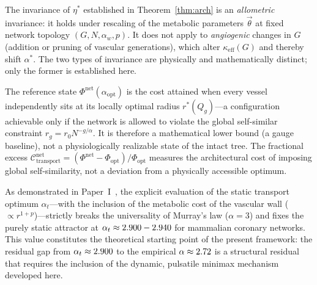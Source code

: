 \begin{remark}
The invariance of $\eta^*$ established in Theorem~\ref{thm:arch} is an
\emph{allometric} invariance: it holds under rescaling of the metabolic
parameters $\vec{\theta}$ at fixed network topology $(G, N, \alpha_w, p)$. It
does not apply to \emph{angiogenic} changes in $G$ (addition or pruning of
vascular generations), which alter $\kappa_{\mathrm{eff}}(G)$ and thereby shift
$\alpha^*$. The two types of invariance are physically and mathematically
distinct; only the former is established here.
\end{remark}

\begin{remark}
The reference state $\Phi^{\mathrm{net}}(\alpha_{\mathrm{opt}})$ is the cost
attained when every vessel independently sits at its locally optimal radius
$r^*(Q_g)$---a configuration achievable only if the network is allowed to
violate the global self-similar constraint $r_g = r_0 N^{-g/\alpha}$. It is
therefore a mathematical lower bound (a gauge baseline), not a physiologically
realizable state of the intact tree. The fractional excess
$\mathcal{C}^{\mathrm{net}}_{\mathrm{transport}} = (\Phi^{\mathrm{net}} -
\Phi_{\mathrm{opt}})/\Phi_{\mathrm{opt}}$ measures the architectural cost of
imposing global self-similarity, not a deviation from a physically accessible
optimum.
\end{remark}

\begin{remark}
As demonstrated in Paper~I~\cite{paperI}, the explicit evaluation of the static
transport optimum $\alpha_t$---with the inclusion of the metabolic cost of the
vascular wall ($\propto r^{1+p}$)---strictly breaks the universality of Murray's
law ($\alpha=3$) and fixes the purely static attractor at $\alpha_t \approx
2.900-2.940$ for mammalian coronary networks. This value
constitutes the theoretical starting point of the present framework: the
residual gap from $\alpha_t \approx 2.900$ to the empirical $\alpha
\approx 2.72$ is a structural residual that requires the
inclusion of the dynamic, pulsatile minimax mechanism developed here.
\end{remark}
